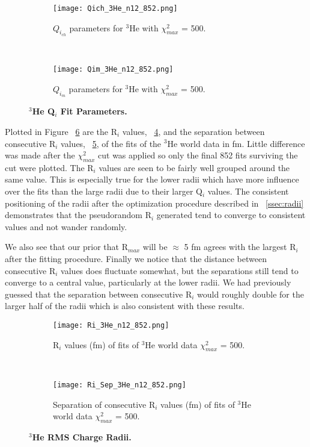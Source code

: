 \begin{figure}[!ht]
\begin{subfigure}{1.\textwidth}
  \centering
  \texttt{[image: Qich\_3He\_n12\_852.png]}
  \caption{$Q_{i_{ch}}$ parameters for $^3$He with $\chi^2_{max}$ = 500.}
  \label{fig:3he_qch}
\end{subfigure}\\
\begin{subfigure}{1.\textwidth}
  \centering
  \texttt{[image: Qim\_3He\_n12\_852.png]}
  \caption{$Q_{i_{m}}$ parameters for $^3$He with $\chi^2_{max}$ = 500.}
  \label{fig:3he_qm}
\end{subfigure}
\caption{\bf{$^3$He Q$_i$ Fit Parameters.}}
\label{fig:3he_qi}
\end{figure}

Plotted in Figure ~\ref{fig:3he_ri} are the R$_i$ values, ~\ref{fig:3he_ri_ind}, and the separation between consecutive R$_i$ values, ~\ref{fig:3he_ri_sep}, of the fits of the $^3$He world data in fm. Little difference was made after the $\chi^2_{max}$ cut was applied so only the final 852 fits surviving the cut were plotted. The R$_i$ values are seen to be fairly well grouped around the same value. This is especially true for the lower radii which have more influence over the fits than the large radii due to their larger Q$_i$ values. The consistent positioning of the radii after the optimization procedure described in ~\ref{ssec:radii} demonstrates that the pseudorandom R$_i$ generated tend to converge to consistent values and not wander randomly. 

We also see that our prior that R$_{max}$ will be $\approx$ 5 fm agrees with the largest R$_i$ after the fitting procedure. Finally we notice that the distance between consecutive R$_i$ values does fluctuate somewhat, but the separations still tend to converge to a central value, particularly at the lower radii. We had previously guessed that the separation between consecutive R$_i$ would roughly double for the larger half of the radii which is also consistent with these results.

\begin{figure}[!ht]
\begin{subfigure}{1.\textwidth}
  \centering
  \texttt{[image: Ri\_3He\_n12\_852.png]}
  \caption{R$_i$ values (fm) of fits of $^3$He world data $\chi^2_{max}$ = 500.}
  \label{fig:3he_ri_ind}
\end{subfigure}\\
\begin{subfigure}{1.\textwidth}
  \centering
  \texttt{[image: Ri\_Sep\_3He\_n12\_852.png]}
  \caption{Separation of consecutive R$_i$ values (fm) of fits of $^3$He world data $\chi^2_{max}$ = 500.}
  \label{fig:3he_ri_sep}
\end{subfigure}
\caption{\bf{$^3$He RMS Charge Radii.}}
\label{fig:3he_ri}
\end{figure}


